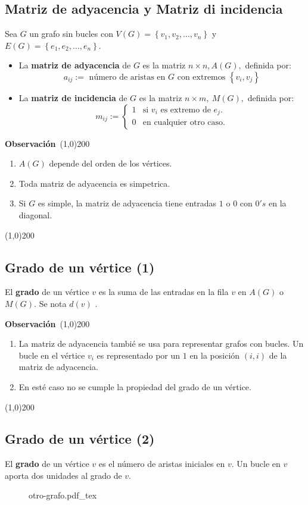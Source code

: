\documentclass[a4paper]{book}
\newcommand{\incfig}[2][1]{%
    \def\svgwidth{#1\columnwidth}
    {#2.pdf_tex}
}
\newenvironment{obs}
    {
        \begin{flushleft}
       \textbf{Observación}\
        \line(1,0){200} \
        \end{flushleft}
    }
    {
        \begin{flushright}
        \line(1,0){200}
        \end{flushright}
    }
\begin{document}
\subsection{Matriz de adyacencia y Matriz di incidencia}
Sea \(G\) un grafo sin bucles con \(V\left(G\right)=\left\{v_1,v_2,\ldots,v_{n}
\right\}\) y  \(E\left(G\right)=\left\{e_1,e_2,\ldots,e_{n}\right\}\).
\begin{itemize}
    \item La \textbf{matriz de adyacencia} de \(G\) es la matriz \(n\times n,
        A\left(G\right),\) definida por:
        \[
        a_{ij}:= \text{ número de aristas  en }G \text{ con extremos }
        \left\{v_{i},v_{j}\right\}
        \]
    \item La \textbf{matriz de incidencia} de \(G\) es la matriz \(n\times m,\
        M\left(G\right),\) definida por:
        \[m_{ij} := \left\{
            \begin{array}{ll}
                1  & \text{si }v_{i} \text{ es extremo de } e_{j}. \\
                0  & \text{en cualquier otro caso.}
            \end{array}
        \right.
        \]
\end{itemize}

\begin{obs}
    \begin{enumerate}
        \item \(A\left( G \right)\) depende del orden de los vértices.
        \item Toda matriz de adyacencia es simpetrica.
        \item Si \(G\) es simple, la matriz de adyacencia tiene entradas \(1\)
            o \(0\) con \(0's\) en la diagonal.
    \end{enumerate}
\end{obs}

\subsection{Grado de un vértice (1)}
El \textbf{grado} de un vértice \(v\) es la suma de las entradas en la fila \(v\) en \(A\left( G \right)\) o \(M\left( G \right) \). {\color{teal} Se nota \(d\left( v \right) \) }.

\begin{obs}
    \begin{enumerate}
        \item La matriz de adyacencia tambié se usa para representar grafos con
            bucles. Un bucle en el vértice \(v_{i}\) es representado por un
            \(1\) en la posición \(\left( i,i \right) \) de la matriz de
            adyacencia.
        \item {\color{orange} En esté caso no se cumple la propiedad del grado de un vértice.}
    \end{enumerate}
\end{obs}

\subsection{Grado de un vértice (2)}
El \textbf{grado} de un vértice \(v\) es el número de aristas iniciales en
\(v\). {\color{teal}Un bucle en \(v\) aporta dos unidades al grado de  \(v\)}.
\begin{figure}[ht]
    \centering
    \incfig[0.7]{otro-grafo}
\end{figure}
\end{document}
